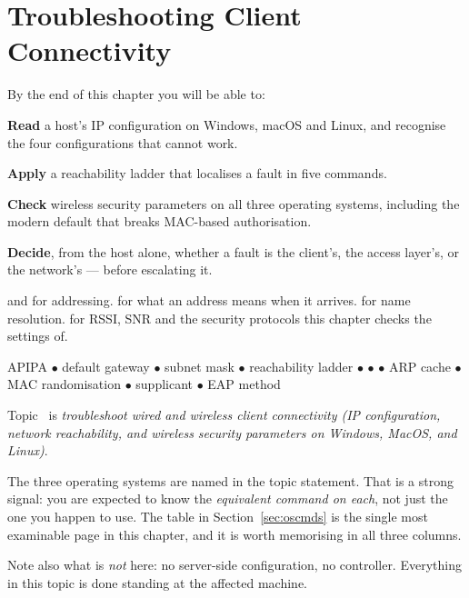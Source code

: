 \chapter{Troubleshooting Client Connectivity}\label{ch:clienttshoot}

\begin{outcomes}
By the end of this chapter you will be able to:
\begin{tight}
  \item \textbf{Read} a host's IP configuration on Windows, macOS and Linux, and
        recognise the four configurations that cannot work.
  \item \textbf{Apply} a reachability ladder that localises a fault in five
        commands.
  \item \textbf{Check} wireless security parameters on all three operating
        systems, including the modern default that breaks MAC-based
        authorisation.
  \item \textbf{Decide}, from the host alone, whether a fault is the client's, the
        access layer's, or the network's --- before escalating it.
\end{tight}
\end{outcomes}

\begin{prereq}
 and  for addressing.  for what an address
means when it arrives.  for name resolution.  for RSSI,
SNR and the security protocols this chapter checks the settings of.
\end{prereq}

\begin{keyterms}
APIPA $\bullet$ default gateway $\bullet$ subnet mask $\bullet$ reachability
ladder $\bullet$  $\bullet$  $\bullet$ ARP cache
$\bullet$ MAC randomisation $\bullet$ supplicant $\bullet$ EAP method
\end{keyterms}

\begin{examnote}
Topic~ is \emph{troubleshoot wired and wireless client connectivity (IP
configuration, network reachability, and wireless security parameters on Windows,
MacOS, and Linux)}.

The three operating systems are named in the topic statement. That is a strong
signal: you are expected to know the \emph{equivalent command on each}, not just
the one you happen to use. The table in Section~\ref{sec:oscmds} is the single most
examinable page in this chapter, and it is worth memorising in all three
columns.

Note also what is \emph{not} here: no server-side configuration, no controller.
Everything in this topic is done standing at the affected machine.
\end{examnote}

